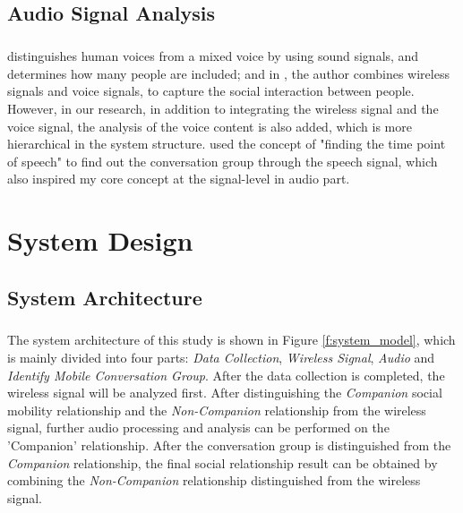 \documentclass[a4paper,12pt]{report}
\begin{document}
\section{Audio Signal Analysis}
\paragraph{}
\cite{yasmin2019speaker} distinguishes human voices from a mixed voice by using sound signals, and determines how many people are included; and in \cite{baker2017next2me} , the author combines wireless signals and voice signals, to capture the social interaction between people. However, in our research, in addition to integrating the wireless signal and the voice signal, the analysis of the voice content is also added, which is more hierarchical in the system structure. \cite{chen2015inference} used the concept of "finding the time point of speech" to find out the conversation group through the speech signal, which also inspired my core concept at the signal-level in audio part.
\chapter{System Design}
\section{System Architecture}
\paragraph{}
The system architecture of this study is shown in Figure \ref{f:system_model}, which is mainly divided into four parts: \emph{Data Collection}, \emph{Wireless Signal}, \emph{Audio} and \emph{Identify Mobile Conversation Group}. After the data collection is completed, the wireless signal will be analyzed first. After distinguishing the \emph{Companion} social mobility relationship and the \emph{Non-Companion} relationship from the wireless signal, further audio processing and analysis can be performed on the 'Companion' relationship. After the conversation group is distinguished from the \emph{Companion} relationship, the final social relationship result can be obtained by combining the \emph{Non-Companion} relationship distinguished from the wireless signal.
\end{document}
